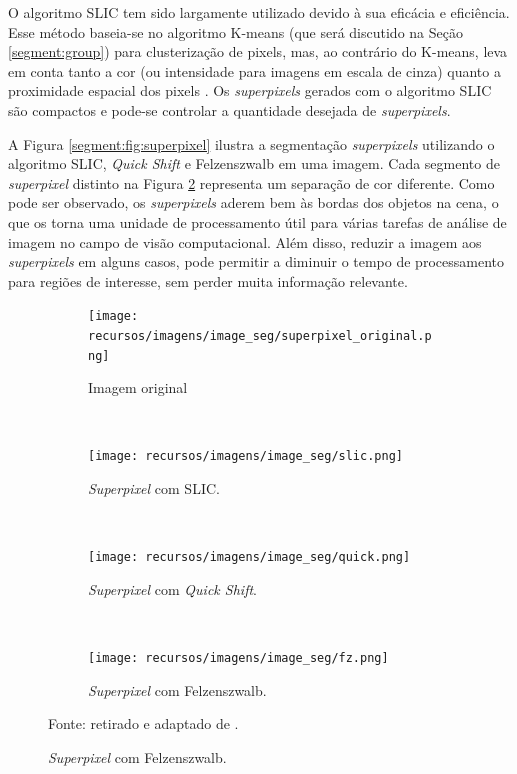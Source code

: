 O algoritmo SLIC tem sido largamente utilizado devido à sua eficácia e eficiência. Esse método baseia-se no algoritmo K-means (que será discutido na Seção \ref{segment:group}) para clusterização de pixels, mas, ao contrário do K-means, leva em conta tanto a cor (ou intensidade para imagens em escala de cinza) quanto a proximidade espacial dos pixels \citep{Achanta2012SLICMethods}. Os \textit{superpixels} gerados com o algoritmo SLIC são compactos e pode-se controlar a quantidade desejada de \textit{superpixels}.

A Figura \ref{segment:fig:superpixel} ilustra a segmentação \textit{superpixels} utilizando o algoritmo SLIC, \textit{Quick Shift} e Felzenszwalb em uma imagem. Cada segmento de \textit{superpixel} distinto na Figura \ref{segment:fig:superpixel.2} representa um separação de cor diferente. Como pode ser observado, os \textit{superpixels} aderem bem às bordas dos objetos na cena, o que os torna uma unidade de processamento útil para várias tarefas de análise de imagem no campo de visão computacional. Além disso, reduzir a imagem aos \textit{superpixels} em alguns casos, pode permitir a diminuir o tempo de processamento para regiões de interesse, sem perder muita informação relevante.

\begin{figure}[H]
   \caption{Exemplo da segmentação com \textit{superpixels}.}
   \centering
   \label{segment:fig:superpixel}
    \begin{subfigure}[t]{0.45\textwidth}
        \centering
        \texttt{[image: recursos/imagens/image\_seg/superpixel\_original.png]}
        \caption{Imagem original}
        \label{segment:fig:superpixel.1}
    \end{subfigure}%
    ~ 
    \begin{subfigure}[t]{0.45\textwidth}
        \centering
        \texttt{[image: recursos/imagens/image\_seg/slic.png]}
        \caption{\textit{Superpixel} com SLIC.}
        \label{segment:fig:superpixel.2}
    \end{subfigure}%
    ~ 
    
    \begin{subfigure}[t]{0.45\textwidth}
        \centering
        \texttt{[image: recursos/imagens/image\_seg/quick.png]}
        \caption{\textit{Superpixel} com \textit{Quick Shift}.}
        \label{segment:fig:superpixel.3}
    \end{subfigure}
    ~
    \begin{subfigure}[t]{0.45\textwidth}
        \centering
        \texttt{[image: recursos/imagens/image\_seg/fz.png]}
        \caption{\textit{Superpixel} com Felzenszwalb.}
        \label{segment:fig:superpixel.4}
    \end{subfigure}
    
    Fonte: retirado e adaptado de \cite{Neuhold2017_ICCV}.
\end{figure}

